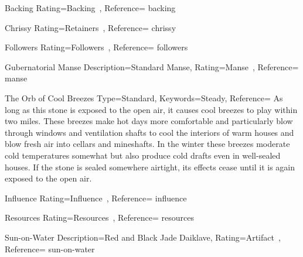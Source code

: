 ﻿


\begin{Merit}{Backing}{%
    Rating=Backing~,
    Reference=\cite*[p.~159]{ex3}
}{backing}
    \TBW
\end{Merit}


\begin{Merit}{Chrissy}{%
    Rating=Retainers~,
    Reference=\cite*[p.~164]{ex3}
}{chrissy}
    \TBW
\end{Merit}


\begin{Merit}{Followers}{%
    Rating=Followers~,
    Reference=\cite*[p.~161]{ex3}
}{followers}
    \TBW
\end{Merit}


\begin{Merit}{Gubernatorial Manse}{%
    Description={Standard Manse},
    Rating=Manse~,
    Reference=\cite*[p.~163]{ex3}
}{manse}
    \TBW

    \begin{Hearthstone}{The Orb of Cool Breezes}{%
        Type=Standard,
        Keywords=Steady,
        Reference=\cite*[p.~604]{ex3}
    }
        As long as this stone is exposed to the open air, it causes cool
        breezes to play within two miles. These breezes make hot days more
        comfortable and particularly blow through windows and ventilation
        shafts to cool the interiors of warm houses and blow fresh air into
        cellars and mineshafts. In the winter these breezes moderate cold
        temperatures somewhat but also produce cold drafts even in
        well-sealed houses. If the stone is sealed somewhere airtight, its
        effects cease until it is again exposed to the open air.
    \end{Hearthstone}
\end{Merit}


\begin{Merit}{Influence}{%
    Rating=Influence~,
    Reference=\cite*[p.~162]{ex3}
}{influence}
    \TBW
\end{Merit}


\begin{Merit}{Resources}{%
    Rating=Resources~,
    Reference=\cite*[p.~164]{ex3}
}{resources}
    \TBW
\end{Merit}


\begin{Merit}{Sun-on-Water}{%
    Description={Red and Black Jade Daiklave},
    Rating=Artifact~,
    Reference=\cite*[p.~159]{ex3}
}{sun-on-water}
    \TBW


\end{Merit}


\printbibliography[title=References]


